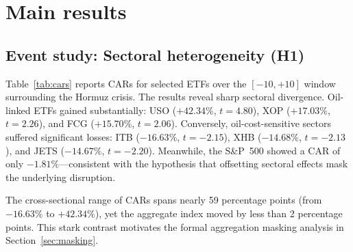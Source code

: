 \documentclass[12pt,preprint,authoryear]{elsarticle}
\begin{document}
\section{Main results}\label{sec:results}

\subsection{Event study: Sectoral heterogeneity (H1)}
Table~\ref{tab:cars} reports CARs for selected ETFs over the $[-10, +10]$ window surrounding the Hormuz crisis. The results reveal sharp sectoral divergence. Oil-linked ETFs gained substantially: USO ($+42.34\%$, $t = 4.80$), XOP ($+17.03\%$, $t = 2.26$), and FCG ($+15.70\%$, $t = 2.06$). Conversely, oil-cost-sensitive sectors suffered significant losses: ITB ($-16.63\%$, $t = -2.15$), XHB ($-14.68\%$, $t = -2.13$), and JETS ($-14.67\%$, $t = -2.20$). Meanwhile, the S\&P~500 showed a CAR of only $-1.81\%$---consistent with the hypothesis that offsetting sectoral effects mask the underlying disruption.

The cross-sectional range of CARs spans nearly 59 percentage points (from $-16.63\%$ to $+42.34\%$), yet the aggregate index moved by less than 2 percentage points. This stark contrast motivates the formal aggregation masking analysis in Section~\ref{sec:masking}.
\end{document}
